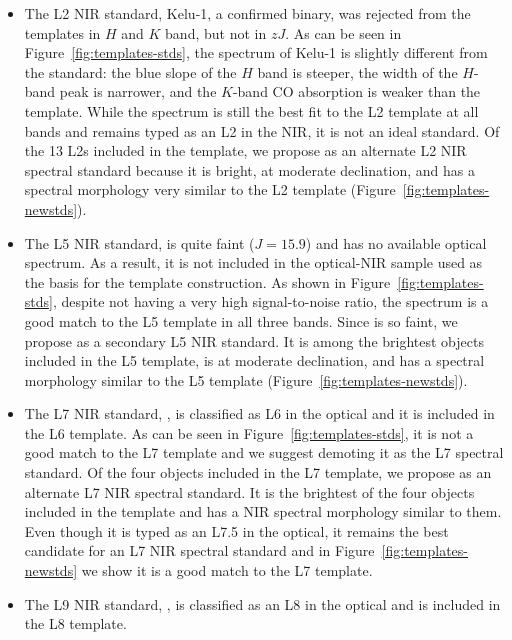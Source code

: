 \documentclass[12pt,preprint]{aastex}
\begin{document}
\begin{itemize}

	\item The L2 NIR standard,  Kelu-1, a confirmed binary, was rejected from the templates in $H$ and $K$ band, but not in $zJ$. As can be seen in Figure~\ref{fig:templates-stds}, the spectrum of Kelu-1 is slightly different from the standard: the blue slope of the $H$ band is steeper, the width of the $H$-band peak is narrower, and the $K$-band CO absorption is weaker than the template. While the spectrum is still the best fit to the L2 template at all bands and remains typed as an L2 in the NIR, it is not an ideal standard. Of the 13 L2s included in the template, we propose  as an alternate L2 NIR spectral standard because it is bright, at moderate declination, and has a spectral morphology very similar to the L2 template (Figure~\ref{fig:templates-newstds}).

	\item The L5 NIR standard,  is quite faint ($J=15.9$) and has no available optical spectrum. As a result, it is not included in the optical-NIR sample used as the basis for the template construction. As shown in Figure~\ref{fig:templates-stds}, despite not having a very high signal-to-noise ratio, the spectrum is a good match to the L5 template in all three bands. Since  is so faint, we propose  as a secondary L5 NIR standard. It is among the brightest objects included in the L5 template, is at moderate declination, and has a spectral morphology similar to the L5 template (Figure~\ref{fig:templates-newstds}). 

	\item The L7 NIR standard, , is classified as L6 in the optical \cite{K00} and it is included in the L6 template. 
	As can be seen in Figure~\ref{fig:templates-stds}, it is not a good match to the L7 template and we suggest demoting it as the L7 spectral standard. 
	Of the four objects included in the L7 template, we propose  as an alternate L7 NIR spectral standard. 
	It is the brightest of the four objects included in the template and has a NIR spectral morphology similar to them. 
	Even though it is typed as an L7.5 in the optical, it remains the best candidate for an L7 NIR spectral standard and in Figure~\ref{fig:templates-newstds} we show it is a good match to the L7 template.	
		
	\item The L9 NIR standard, , is classified as an L8 in the optical and is included in the L8 template. 
	
\end{itemize}
\end{document}
